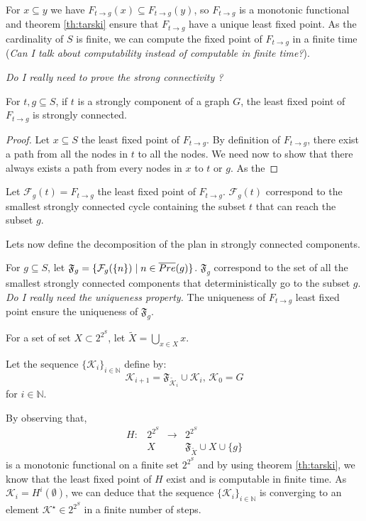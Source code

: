 For $x \subseteq y$ we have $F_{t \rightarrow g} (x) \subseteq F_{t \rightarrow g}(y)$, so $F_{t \rightarrow g}$ is a monotonic functional and theorem \ref{th:tarski} ensure that $F_{t \rightarrow g}$ have a unique least fixed point.
As the cardinality of $S$ is finite, we can compute the fixed point of $F_{t \rightarrow g}$ in a finite time
(\textit{Can I talk about computability instead of computable in finite time?}).

\textit{Do I really need to prove the strong connectivity ?}
\begin{prop}
For $t,g \subseteq S$, if $t$ is a strongly component of a graph $G$, the least fixed point of $F_{t \rightarrow g}$ is strongly connected.
\end{prop}

\begin{proof} 
Let $x \subseteq S$ the least fixed point of $F_{t \rightarrow g}$.
By definition of $F_{t \rightarrow g}$, there exist a path from all the nodes in $t$ to all the nodes.
We need now to show that there always exists a path from every nodes in $x$ to $t$ or $g$.
As the 
\end{proof}

Let $\mathcal{F}_g(t) = F_{t \rightarrow g}$ the least fixed point of $F_{t \rightarrow g}$.
$\mathcal{F}_g(t)$ correspond to the smallest strongly connected cycle containing the subset $t$ that can reach the subset $g$.

Lets now define the decomposition of the plan in strongly connected components.

For $g \subseteq S$, let $\mathfrak{F}_g = \{ \mathcal{F}_g(\{n\}) \mid n \in \overline{Pre} (g) \}$.
$\mathfrak{F}_g$ correspond to the set of all the smallest strongly connected components that deterministically go to the subset $g$.
\textit{Do I really need the uniqueness property.}
The uniqueness of  $F_{t \rightarrow g}$ least fixed point ensure the uniqueness of $\mathfrak{F}_g$.

For a set of set $X \subset 2^{2^S}$, let $\tilde{X} = \bigcup_{x \in X} x$.

Let the sequence $\{\mathcal{K}_i\}_{i \in \mathbb{N}}$ define by:
\begin{equation*}
\mathcal{K}_{i+1}  = \mathfrak{F}_{\tilde{\mathcal{K}}_i} \cup \mathcal{K}_i
\textrm{, }
\mathcal{K}_0 = G
\end{equation*}
for $i \in \mathbb{N}$. 

By observing that,
\begin{equation}
\begin{array}{llll}
H : &2^{2^S} &\rightarrow &2^{2^S}\\
&X & & \mathfrak{F}_{\tilde{X}} \cup X \cup \{ g \}
\end{array}
\end{equation}
is a monotonic functional on a finite set $2^{2^S}$ and by using theorem \ref{th:tarski}, we know that the least fixed point of $H$ exist and is computable in finite time.
As $\mathcal{K}_i = H^i(\emptyset)$, we can deduce that the sequence $\{\mathcal{K}_i\}_{i \in \mathbb{N}}$ is converging to an element $\mathcal{K}^\star \in 2^{2^S}$ in a finite number of steps.

